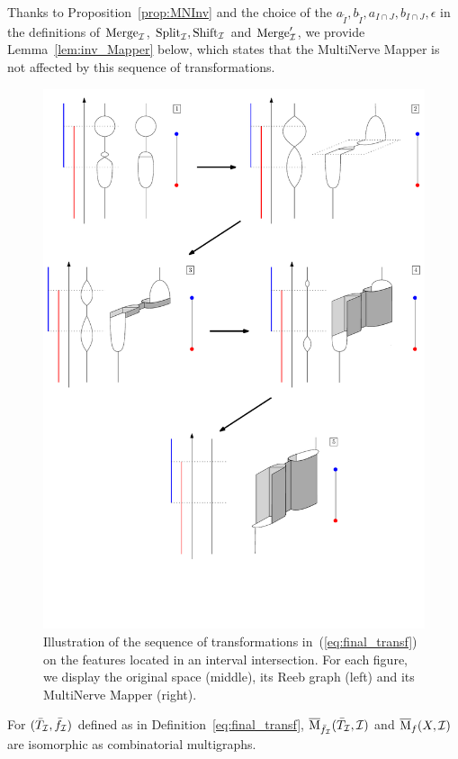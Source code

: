 Thanks to Proposition~\ref{prop:MNInv} and the
choice of the $a_{{\tilde I}},b_{{\tilde I}},a_{I\cap J},b_{I\cap J},\epsilon$ 
in the definitions of $\mathrm{Merge}_{\mathcal{I}}$, $\mathrm{Split}_{\mathcal{I}}, \mathrm{Shift}_{\mathcal{I}}$ and $\mathrm{Merge}'_{\mathcal{I}}$,
we provide Lemma~\ref{lem:inv_Mapper} below, which states that the MultiNerve Mapper
is not affected by this sequence of transformations. 

\begin{figure}[!htb]
\begin{center}
\includegraphics[width=12cm]{figures/Summary}
\caption[Full transformation on spaces]{\label{fig:summary} Illustration of the sequence of
  transformations in~(\ref{eq:final_transf}) on the features located in an interval
  intersection. For each figure, we display the original space
  (middle), its Reeb graph (left) and its MultiNerve Mapper (right).}
\end{center}
\end{figure}

\begin{lem}\label{lem:inv_Mapper}
For $(\bar T_{\mathcal I},\bar f_{\mathcal I})$ defined as in Definition~\ref{eq:final_transf},
$\overline{\mathrm{M}}_{\bar f_{\mathcal I}}(\bar T_{\mathcal I},\mathcal{I})$ and $\overline{\mathrm{M}}_f(X,\mathcal{I})$ are isomorphic as combinatorial multigraphs.
\end{lem}



